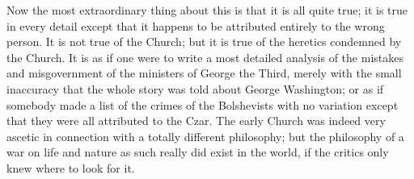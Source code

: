 Now the most extraordinary thing about this is that it is all quite true; it is true in every detail except that it happens to be attributed entirely to the wrong person. It is not true of the Church; but it is true of the heretics condemned by the Church. It is as if one were to write a most detailed analysis of the mistakes and misgovernment of the ministers of George the Third, merely with the small inaccuracy that the whole story was told about George Washington; or as if somebody made a list of the crimes of the Bolshevists with no variation except that they were all attributed to the Czar. The early Church was indeed very ascetic in connection with a totally different philosophy; but the philosophy of a war on life and nature as such really did exist in the world, if the critics only knew where to look for it.

